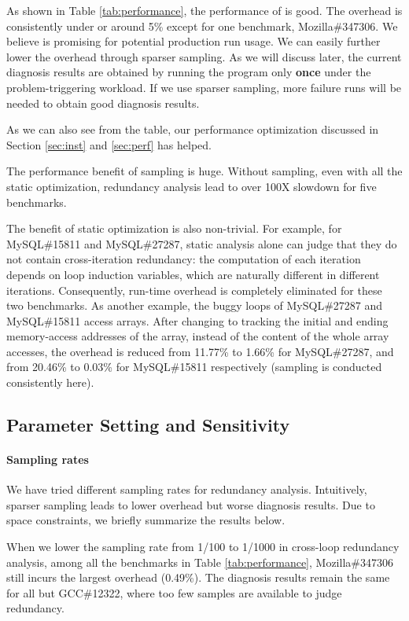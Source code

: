 As shown in Table \ref{tab:performance}, 
the performance of \Tool is good. The overhead is consistently under or around 5\% 
except for one benchmark, Mozilla\#347306. We believe \Tool is promising for potential production
run usage.
We can easily further lower the overhead through sparser sampling.
As we will discuss later, 
the current diagnosis results are obtained by running the
program only \textbf{once} under the problem-triggering workload.
If we use sparser sampling, more failure runs will be needed to obtain good
diagnosis results.

As we can also see from the table, our performance optimization discussed in 
Section \ref{sec:inst} and \ref{sec:perf} has helped.

The performance benefit of sampling is huge.
Without sampling, even with all the static optimization, redundancy
analysis lead to over 100X slowdown for five benchmarks.

The benefit of static optimization is also non-trivial. 
For example, for MySQL\#15811 and MySQL\#27287, static analysis alone can
judge that they do not contain cross-iteration redundancy: the computation of 
each iteration depends on loop induction variables, which are naturally different
in different iterations. Consequently, run-time overhead is completely
eliminated for these two benchmarks.
As another example, the buggy loops of MySQL\#27287 and MySQL\#15811 access 
arrays. 
After changing to tracking the initial and ending memory-access addresses
of the array, instead of the content of the whole array accesses,
the overhead is reduced from 11.77\% to 1.66\% for MySQL\#27287, 
and from 20.46\% to 0.03\% for MySQL\#15811 respectively 
(sampling is conducted consistently here). 

\subsection{Parameter Setting and Sensitivity}
\label{sec:sensi}
\paragraph{Sampling rates}
We have tried different sampling rates for redundancy analysis.
Intuitively, sparser sampling leads to lower overhead but worse diagnosis
results. Due to space constraints, we briefly summarize the results below.

When we lower the sampling rate from 1/100 to 1/1000 
in cross-loop redundancy analysis,
among all the benchmarks in Table \ref{tab:performance},
Mozilla\#347306 still incurs the largest overhead (0.49\%). 
The diagnosis results remain the same for all but
GCC\#12322, where too few samples are available
to judge redundancy.

